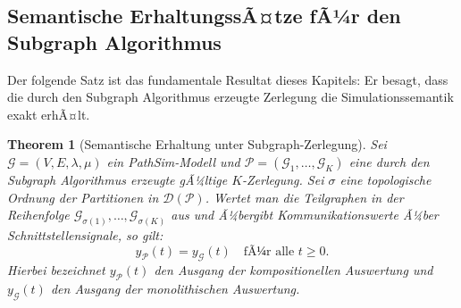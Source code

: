 ﻿\documentclass[12pt,a4paper]{article}
\newtheorem{theorem}{Theorem}[section]
\theoremstyle{definition}
\begin{document}
\subsection{Semantische ErhaltungssÃ¤tze fÃ¼r den Subgraph Algorithmus}
\label{subsec:subgraph-sem}

Der folgende Satz ist das fundamentale Resultat dieses Kapitels:
Er besagt, dass die durch den Subgraph Algorithmus erzeugte Zerlegung
die Simulationssemantik exakt erhÃ¤lt.

\begin{theorem}[Semantische Erhaltung unter Subgraph-Zerlegung]
\label{thm:sempreserve}
Sei $\mathcal{G} = (V, E, \lambda, \mu)$ ein PathSim-Modell und
$\mathcal{P} = (\mathcal{G}_1, \ldots, \mathcal{G}_K)$ eine durch den
Subgraph Algorithmus erzeugte gÃ¼ltige $K$-Zerlegung. Sei $\sigma$ eine
topologische Ordnung der Partitionen in $\mathcal{D}(\mathcal{P})$.
Wertet man die Teilgraphen in der Reihenfolge
$\mathcal{G}_{\sigma(1)}, \ldots, \mathcal{G}_{\sigma(K)}$ aus und Ã¼bergibt
Kommunikationswerte Ã¼ber Schnittstellensignale, so gilt:
\[
  y_{\mathcal{P}}(t) = y_{\mathcal{G}}(t) \quad \text{fÃ¼r alle } t \geq 0.
\]
Hierbei bezeichnet $y_{\mathcal{P}}(t)$ den Ausgang der kompositionellen
Auswertung und $y_{\mathcal{G}}(t)$ den Ausgang der monolithischen Auswertung.
\end{theorem}
\end{document}
